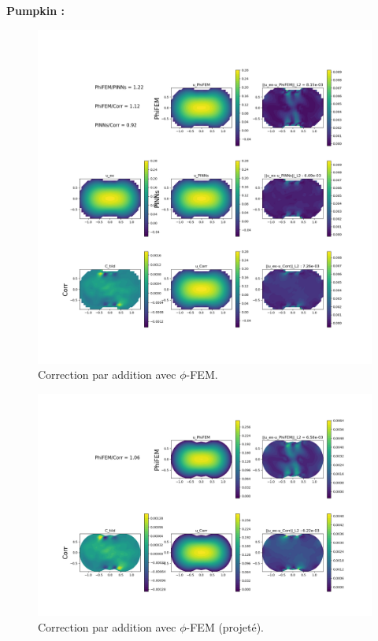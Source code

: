\documentclass[french]{article}
\begin{document}
	\newpage
	\textbf{Pumpkin :}
	
	\begin{figure}[H]
		\centering
		\includegraphics[width=0.6\linewidth]{"correction/pumpkin/corr_PhiFEM.png"}
		\caption{Correction par addition avec $\phi$-FEM.}
	\end{figure}
	
	\begin{figure}[H]
		\centering
		\includegraphics[width=0.6\linewidth]{"correction/pumpkin/corr_PhiFEM_Omega.png"}
		\caption{Correction par addition avec $\phi$-FEM (projeté).}
	\end{figure}

	\newpage
	\printbibliography
\end{document}
